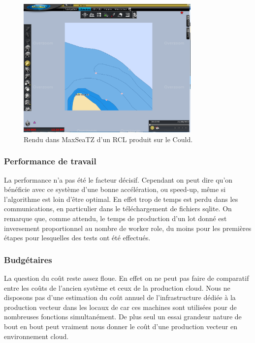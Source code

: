 \begin{figure}[h!]
  \caption{Rendu dans MaxSeaTZ d'un RCL produit sur le Could.}
  \centering
    \includegraphics[width=0.8\textwidth]{images/rcl_L10_R799_C146.png}
\end{figure}

%
%



\subsubsection{Performance de travail}
La performance n'a pas été le facteur décisif. Cependant on peut dire
qu'on bénéficie avec ce système d'une bonne accélération, ou speed-up,
même si l'algorithme est loin d'être optimal. En effet trop de temps
est perdu dans les communications, en particulier dans le
téléchargement de fichiers sqlite. On remarque que, comme attendu, le
temps de production d'un lot donné est inversement proportionnel au
nombre de worker role, du moins pour les premières étapes pour
lesquelles des tests ont été effectués.

\subsubsection{Budgétaires}
La question du coût reste assez floue. En effet on ne peut pas faire
de comparatif entre les coûts de l'ancien système et ceux de la
production cloud. Nous ne disposons pas d'une estimation du coût
annuel de l'infrastructure dédiée à la production vecteur dans les
locaux de \maxsea car ces machines sont utilisées pour de nombreuses
fonctions simultanément. De plus seul un essai grandeur nature de bout
en bout peut vraiment nous donner le coût d'une production vecteur en
environnement cloud.


